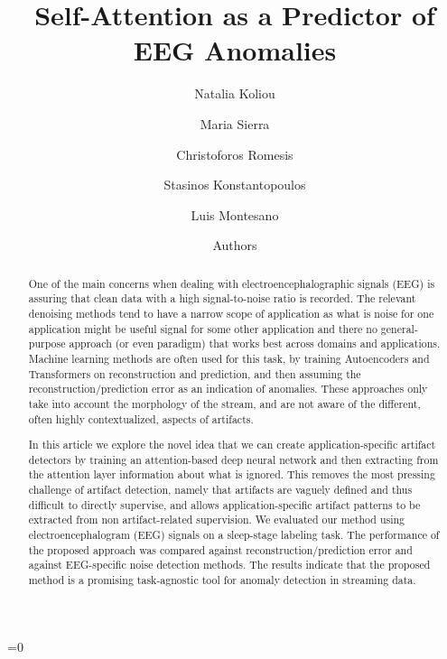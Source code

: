 \documentclass[runningheads]{llncs}
\def\anon{1}
\begin{document}
\title{Self-Attention as a Predictor of EEG Anomalies}

\ifnum\anon=0

\author{Natalia Koliou \and
Maria Sierra \and
Christoforos Romesis \and
Stasinos Konstantopoulos \and
Luis Montesano
}

  

\else

\author{Authors}

\fi


\maketitle

\begin{abstract}

One of the main concerns when dealing with electroencephalographic
signals (EEG) is assuring that clean data with a high signal-to-noise
ratio is recorded. The relevant denoising methods tend to have
a narrow scope of application as what is noise for one
application might be useful signal for some other application and
there no general-purpose approach (or even paradigm) that works best
across domains and applications.
%
Machine learning methods are often used for this task, by
training Autoencoders and Transformers on reconstruction and
prediction, and then assuming the reconstruction/prediction error as
an indication of anomalies. These approaches only take into account
the morphology of the stream, and are not aware of the different,
often highly contextualized, aspects of artifacts.

In this article we explore the novel idea that we can create
application-specific artifact detectors by training an
attention-based deep neural network and then extracting from the
attention layer information about what is ignored.
This removes the most pressing challenge of artifact detection, namely
that artifacts are vaguely defined and thus difficult to directly
supervise, and allows application-specific artifact patterns to be
extracted from non artifact-related supervision.
%
We evaluated our method using electroencephalogram (EEG) signals on a
sleep-stage labeling task. The performance of the proposed approach
was compared against reconstruction/prediction error and against
EEG-specific noise detection methods. The results indicate that the
proposed method is a promising task-agnostic tool for anomaly
detection in streaming data.

\end{abstract}
\end{document}
